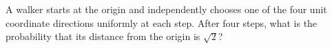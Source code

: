 A walker starts at the origin and independently chooses one of the four unit coordinate directions uniformly at each step. After four steps, what is the probability that its distance from the origin is $\sqrt2$?
